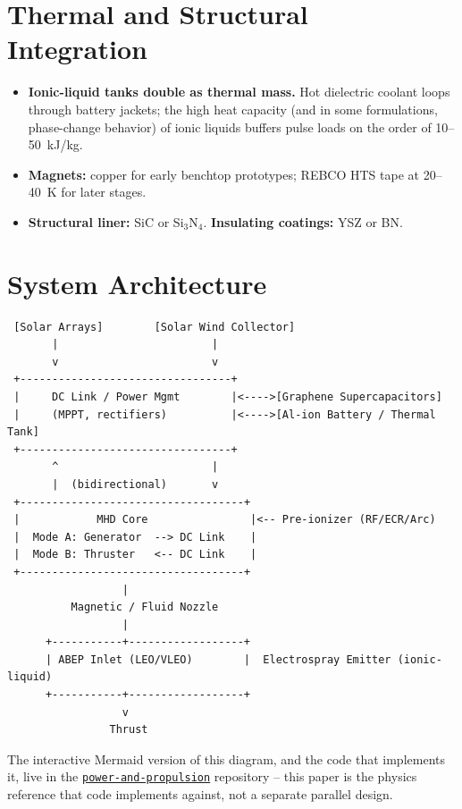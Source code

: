 \documentclass[12pt]{article}
\begin{document}
\section{Thermal and Structural Integration}
\begin{itemize}
    \item \textbf{Ionic-liquid tanks double as thermal mass.} Hot dielectric coolant loops through battery jackets; the high heat capacity (and in some formulations, phase-change behavior) of ionic liquids buffers pulse loads on the order of 10--50~kJ/kg.
    \item \textbf{Magnets:} copper for early benchtop prototypes; REBCO HTS tape at 20--40~K for later stages.
    \item \textbf{Structural liner:} SiC or Si$_3$N$_4$. \textbf{Insulating coatings:} YSZ or BN.
\end{itemize}

\section{System Architecture}
\begin{verbatim}
 [Solar Arrays]        [Solar Wind Collector]
       |                        |
       v                        v
 +---------------------------------+
 |     DC Link / Power Mgmt        |<---->[Graphene Supercapacitors]
 |     (MPPT, rectifiers)          |<---->[Al-ion Battery / Thermal Tank]
 +---------------------------------+
       ^                        |
       |  (bidirectional)       v
 +-----------------------------------+
 |            MHD Core                |<-- Pre-ionizer (RF/ECR/Arc)
 |  Mode A: Generator  --> DC Link    |
 |  Mode B: Thruster   <-- DC Link    |
 +-----------------------------------+
                  |
          Magnetic / Fluid Nozzle
                  |
      +-----------+------------------+
      | ABEP Inlet (LEO/VLEO)        |  Electrospray Emitter (ionic-liquid)
      +-----------+------------------+
                  v
                Thrust
\end{verbatim}

The interactive Mermaid version of this diagram, and the code that implements it, live in the \href{https://github.com/Overby-Industries/power-and-propulsion}{\texttt{power-and-propulsion}} repository -- this paper is the physics reference that code implements against, not a separate parallel design.
\end{document}
